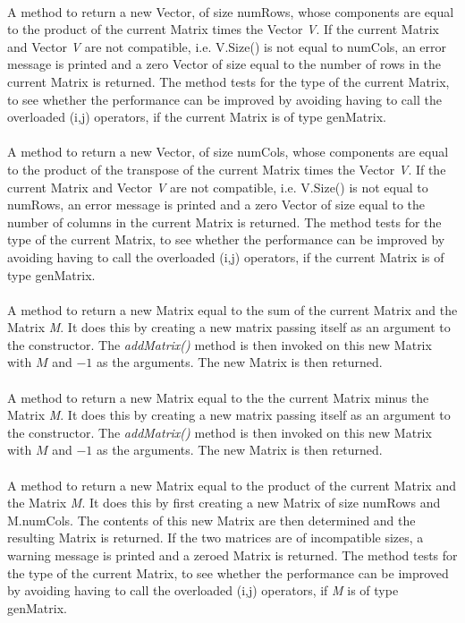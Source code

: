  \\
A method to return a new Vector, of size numRows, whose components are
equal to the product of the current Matrix times the Vector {\em
V}. If the current Matrix and Vector {\em V} are not compatible,
i.e. V.Size() is not equal to numCols, an error message is printed and 
a zero Vector of size equal to the number of rows in the current
Matrix is returned. The method tests for the type of the current
Matrix, to see whether the performance can be improved by avoiding
having to call the overloaded (i,j) operators, if the current Matrix
is of type genMatrix. \\ 

 \\ 
A method to return a new Vector, of size numCols, whose components are
equal to the product of the transpose of the current Matrix times the
Vector {\em V}. If the current Matrix and Vector {\em V} are not
compatible, i.e. V.Size() is not equal to numRows, an error message is
printed and a zero Vector of size equal to the number of columns in
the current Matrix is returned. The method tests for the type of the
current Matrix, to see whether the performance can be improved by
avoiding having to call the overloaded (i,j) operators, if the current
Matrix is of type genMatrix. \\ 

 \\
A method to return a new Matrix equal to the sum of the current Matrix
and the Matrix {\em M}. It does this by creating a new matrix passing
itself as an argument to the constructor. The {\em addMatrix()} method
is then invoked on this new Matrix with $M$ and $-1$ as the
arguments. The new Matrix is then returned. \\ 

 \\
A method to return a new Matrix equal to the the current Matrix minus
the Matrix {\em M}. It does this by creating a new matrix passing
itself as an argument to the constructor. The {\em addMatrix()} method
is then invoked on this new Matrix with $M$ and $-1$ as the
arguments. The new Matrix is then returned. \\ 

 \\
A method to return a new Matrix equal to the product of the current
Matrix and the Matrix {\em M}. It does this by first creating a new
Matrix of size numRows and M.numCols. The contents of this new Matrix
are then determined and the resulting Matrix is returned. If the two
matrices are of incompatible sizes, a warning message is printed and a
zeroed Matrix is returned. The method tests for the type of the
current Matrix, to see whether the performance can be improved by
avoiding having to call the overloaded (i,j) operators, if {\em M} 
is of type genMatrix. \\

